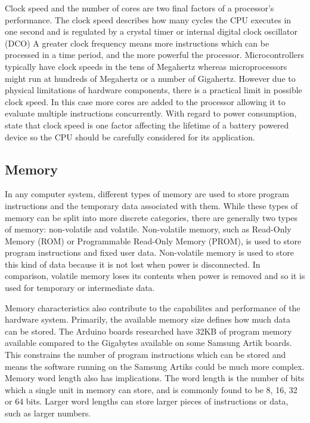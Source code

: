       Clock speed and the number of cores are two final factors of a processor's performance. The clock speed describes how many cycles the CPU executes in one second and is regulated by a crystal timer or internal digital clock oscillator (DCO) A greater clock frequency means more instructions which can be processed in a time period, and the more powerful the processor. Microcontrollers typically have clock speeds in the tens of Megahertz whereas microprocessors might run at hundreds of Megahertz or a number of Gigahertz. However due to physical limitations of hardware components, there is a practical limit in possible clock speed. In this case more cores are added to the processor allowing it to evaluate multiple instructions concurrently. With regard to power consumption, \citet{wsnpower:2010} state that clock speed is one factor affecting the lifetime of a battery powered device so the CPU should be carefully considered for its application.

    \subsection{Memory}
      In any computer system, different types of memory are used to store program instructions and the temporary data associated with them. While these types of memory can be split into more discrete categories, there are generally two types of memory: non-volatile and volatile. Non-volatile memory, such as Read-Only Memory (ROM) or Programmable Read-Only Memory (PROM), is used to store program instructions and fixed user data. Non-volatile memory is used to store this kind of data because it is not lost when power is disconnected. In comparison, volatile memory loses its contents when power is removed and so it is used for temporary or intermediate data.

      Memory characteristics also contribute to the capabilites and performance of the hardware system. Primarily, the available memory size defines how much data can be stored. The Arduino boards researched have 32KB of program memory available compared to the Gigabytes available on some Samsung Artik boards. This constrains the number of program instructions which can be stored and means the software running on the Samsung Artiks could be much more complex. Memory word length also has implications. The word length is the number of bits which a single unit in memory can store, and is commonly found to be 8, 16, 32 or 64 bits. Larger word lengths can store larger pieces of instructions or data, such as larger numbers. 

